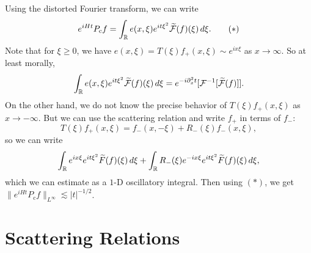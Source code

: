 \begin{remark}
  Using the distorted Fourier transform, we can write
  \[
    e^{iHt} P_{\mathrm{c}} f
    = \int_{\mathbb{R}} e(x, \xi) e^{it \xi^2} \widetilde{\mathcal{F}}(f)(\xi)\, d\xi. \tag{$*$}
  \]
  Note that for $\xi \ge 0$, we have
  $e(x, \xi) = T(\xi) f_+(x, \xi) \sim e^{ix \xi}$
  as $x \to \infty$. So at least morally,
  \[
    \int_{\mathbb{R}} e(x, \xi) e^{it \xi^2} \widetilde{\mathcal{F}}(f)(\xi)\, d\xi
    = e^{-i\partial_x^2 t} [\mathcal{F}^{-1} [\widetilde{\mathcal{F}}(f)]].
  \]
  On the other hand, we do not know the precise
  behavior of $T(\xi) f_+(x, \xi)$ as $x \to -\infty$.
  But we can use the scattering relation and write
  $f_+$ in terms of $f_-$:
  \[
    T(\xi) f_+(x, \xi) = f_-(x, -\xi) + R_-(\xi) f_-(x, \xi),
  \]
  so we can write
  \[
    \int_{\mathbb{R}} e^{ix\xi} e^{it \xi^2} \widetilde{F}(f)(\xi)\, d\xi
    + \int_{\mathbb{R}} R_-(\xi) e^{-ix\xi} e^{it \xi^2} \widetilde{F}(f)(\xi)\, d\xi,
  \]
  which we can estimate as a $1$-D oscillatory
  integral. Then using $(*)$, we get
  $\|e^{iHt} P_{\mathrm{c}} f\|_{L^\infty} \lesssim |t|^{-1 / 2}$.
\end{remark}

\section{Scattering Relations}

